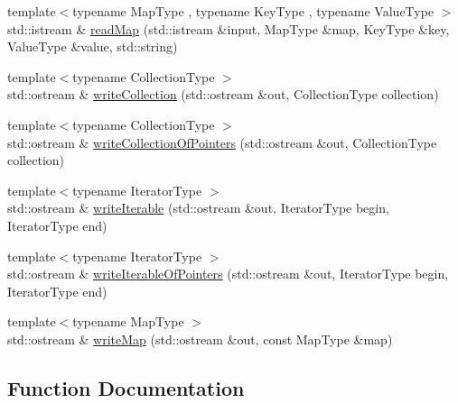 \begin{DoxyCompactItemize}
\item 
{\footnotesize template$<$typename Map\+Type , typename Key\+Type , typename Value\+Type $>$ }\\std\+::istream \& \mbox{\hyperlink{namespacestanfordcpplib_1_1collections_a7e92c7237edb0503f7a9a8666186dbf4}{read\+Map}} (std\+::istream \&input, Map\+Type \&map, Key\+Type \&key, Value\+Type \&value, std\+::string)
\item 
{\footnotesize template$<$typename Collection\+Type $>$ }\\std\+::ostream \& \mbox{\hyperlink{namespacestanfordcpplib_1_1collections_aa0fa77893be51108c73f38f0baf30a02}{write\+Collection}} (std\+::ostream \&out, Collection\+Type collection)
\item 
{\footnotesize template$<$typename Collection\+Type $>$ }\\std\+::ostream \& \mbox{\hyperlink{namespacestanfordcpplib_1_1collections_a0476c2f41f266287172ae36ba9a66266}{write\+Collection\+Of\+Pointers}} (std\+::ostream \&out, Collection\+Type collection)
\item 
{\footnotesize template$<$typename Iterator\+Type $>$ }\\std\+::ostream \& \mbox{\hyperlink{namespacestanfordcpplib_1_1collections_ad5dc1381a951235f3246d586de1bffb9}{write\+Iterable}} (std\+::ostream \&out, Iterator\+Type begin, Iterator\+Type end)
\item 
{\footnotesize template$<$typename Iterator\+Type $>$ }\\std\+::ostream \& \mbox{\hyperlink{namespacestanfordcpplib_1_1collections_a8e61f75a91cbd6dc48440214b8ea509d}{write\+Iterable\+Of\+Pointers}} (std\+::ostream \&out, Iterator\+Type begin, Iterator\+Type end)
\item 
{\footnotesize template$<$typename Map\+Type $>$ }\\std\+::ostream \& \mbox{\hyperlink{namespacestanfordcpplib_1_1collections_a76ae42d89473ff4e20eef94f8bd6d942}{write\+Map}} (std\+::ostream \&out, const Map\+Type \&map)
\end{DoxyCompactItemize}


\subsection{Function Documentation}
\mbox{\label{namespacestanfordcpplib_1_1collections_a9bb653d00a8c6d39cb75101500d14425}} 
